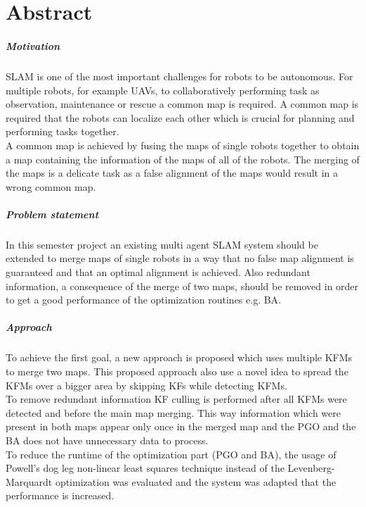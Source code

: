 \chapter*{Abstract}

\paragraph*{Motivation}
\ac{SLAM} is one of the most important challenges for robots to be autonomous. For multiple robots, for example \acp{UAV}, to collaboratively performing task as observation, maintenance or rescue a common map is required. A common map is required that the robots can localize each other which is crucial for planning and performing tasks together.
\\
A common map is achieved by fusing the maps of single robots together to obtain a map containing the information of the maps of all of the robots. The merging of the maps is a delicate task as a false alignment of the maps would result in a wrong common map.

\paragraph*{Problem statement}
In this semester project an existing multi agent \ac{SLAM} system should be extended to merge maps of single robots in a way that no false map alignment is guaranteed and that an optimal alignment is achieved. Also redundant information, a consequence of the merge of two maps, should be removed in order to get a good performance of the optimization routines e.g. \ac{BA}.

\paragraph*{Approach}
To achieve the first goal, a new approach is proposed which uses multiple \acp{KFM} to merge two maps. This proposed approach also use a novel idea to spread the \acp{KFM} over a bigger area by skipping \acp{KF} while detecting \acp{KFM}.\\
To remove redundant information \ac{KF} culling is performed after all \acp{KFM} were detected and before the main map merging. This way information which were present in both maps appear only once in the merged map and the \ac{PGO} and the \ac{BA} does not have unnecessary data to process.\\
To reduce the runtime of the optimization part (\ac{PGO} and \ac{BA}), the usage of Powell's dog leg non-linear least squares technique instead of the Levenberg-Marquardt optimization was evaluated and the system was adapted that the performance is increased.


